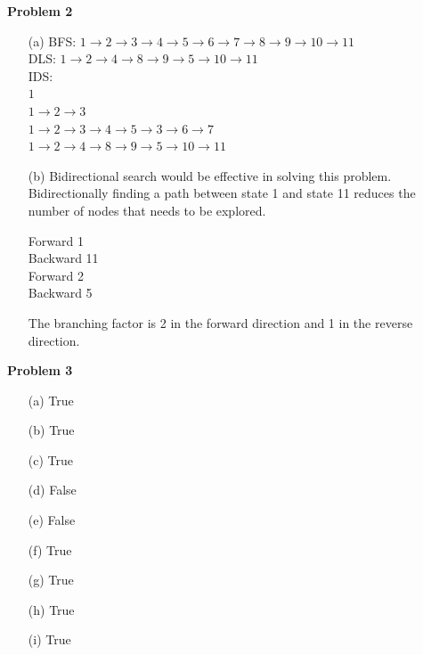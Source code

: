 \documentclass[11pt]{article}
\begin{document}
    \begin{center}
        \Large
        \textbf{Problem 2}
    \end{center}
    \normalsize
    \begin{enumerate}
        \item[(a)] %
          BFS: $1 \rightarrow 2 \rightarrow 3\rightarrow 4 \rightarrow 5 \rightarrow 6 \rightarrow 7 \rightarrow 8 \rightarrow9\rightarrow10\rightarrow11$\\
          DLS: $1\rightarrow2\rightarrow4\rightarrow8\rightarrow9\rightarrow5\rightarrow10\rightarrow11$\\
          IDS: \\
          $1$\\
          $1\rightarrow2\rightarrow3$\\
          $1\rightarrow2\rightarrow3\rightarrow4\rightarrow5\rightarrow3\rightarrow6\rightarrow7$\\
          $1\rightarrow2\rightarrow4\rightarrow8\rightarrow9\rightarrow5\rightarrow10\rightarrow11$
        
        \item[(b)] %
        Bidirectional search would be effective in solving this problem.
        Bidirectionally finding a path between state 1 and state 11 reduces
        the number of nodes that needs to be explored.
        
        Forward   1\\
        Backward  11\\
        Forward   2\\
        Backward  5
        
        The branching factor is 2 in the forward direction and 1 in the reverse direction.
        
    \end{enumerate}

    \begin{center}
        \Large
        \textbf{Problem 3}
    \end{center}
    \normalsize
    \begin{enumerate}
        \item[(a)] True
        \item[(b)] True
        \item[(c)] True
        \item[(d)] False
        \item[(e)] False
        \item[(f)] True
        \item[(g)] True
        \item[(h)] True
        \item[(i)] True
    \end{enumerate}
\end{document}
